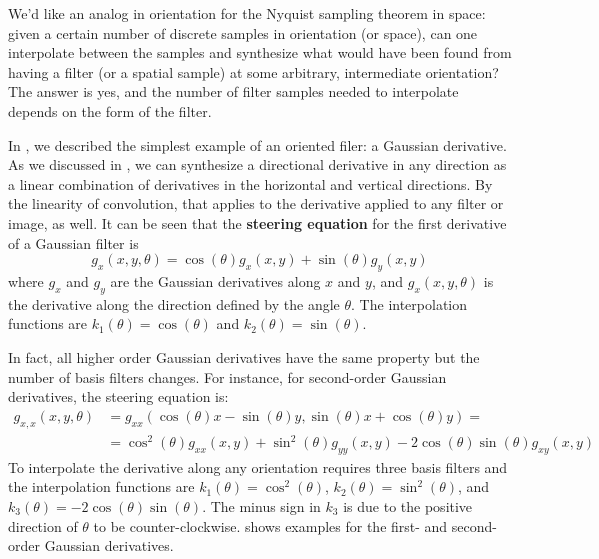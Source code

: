 

We'd like an analog in orientation for the Nyquist sampling theorem in space:  given a certain number of discrete samples in orientation (or space), can one
interpolate between the samples and synthesize what would
have been found from having a filter (or a spatial sample) at some
arbitrary, intermediate orientation?    The answer is yes, and the
number of filter samples needed to interpolate depends on the form of
the filter.


In \chap{\ref{chapter:image_derivatives}}, we described the simplest example of an oriented filer: a Gaussian derivative. As we discussed in \eqn{\ref{eq:steerable_derivative_filter}}, we can synthesize a directional derivative in
any direction as a linear combination of derivatives in the horizontal
and vertical directions.  By the linearity of convolution, that applies to the derivative
applied to any filter or image, as well. It can be seen that the {\bf steering equation}
for the first derivative
of a Gaussian filter is
\begin{equation}
	g_{x}(x,y,\theta) = \cos(\theta) g_x(x,y) + \sin(\theta) g_y(x,y)
\end{equation}
where $g_x$ and $g_y$ are the Gaussian derivatives along $x$ and $y$, and $g_{x}(x,y,\theta)$ is the derivative along the direction defined by the angle $\theta$. The interpolation functions are $k_1(\theta) = \cos(\theta)$ and $k_2(\theta) = \sin(\theta)$.

In fact, all higher order Gaussian derivatives have the same property but the number of basis filters changes. For instance, for second-order Gaussian derivatives, the steering equation is:
\begin{equation}
	\begin{split}
		g_{x,x}(x,y,\theta) & = g_{xx}(\cos(\theta) x - \sin (\theta) y, \sin(\theta) x + \cos (\theta)y) =                       \\
		                    & = \cos^2(\theta) g_{xx}(x,y) + \sin^2(\theta) g_{yy}(x,y) - 2 \cos(\theta) \sin(\theta) g_{xy}(x,y)
	\end{split}
\end{equation}
To interpolate the derivative along any orientation requires three basis filters and the interpolation functions are  $k_1(\theta) = \cos^2(\theta)$, $k_2(\theta) = \sin^2(\theta)$, and $k_3(\theta) = -2\cos(\theta)\sin(\theta)$. The minus sign in $k_3$ is due to the positive direction of $\theta$ to be counter-clockwise. \Fig{\ref{fig:steer1}} shows examples for the first- and second-order Gaussian derivatives.

